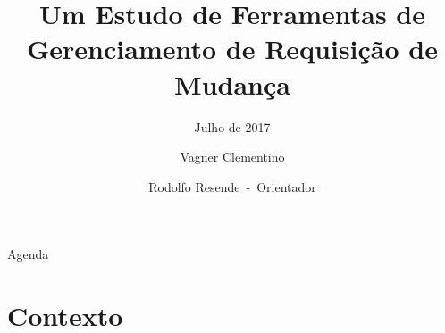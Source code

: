 \documentclass[t,14pt,mathserif]{beamer}
\title[] %
{Um Estudo de Ferramentas de \\
Gerenciamento de Requisição de Mudança}
\subtitle{Julho de 2017}
\author[] %
{Vagner Clementino\\%
	\and Rodolfo Resende~-~Orientador%
	}
\institute[] %
{Departamento de Ciência da Computação\\
 Universidade Federal de Minas Gerais
}
\date[2017/07/13] %
\begin{document}
\begin{frame}
  \titlepage{}
\end{frame}

\begin{frame}{Agenda}
  \tableofcontents[pausesections]
\end{frame}




\section{Contexto}

\end{document}
